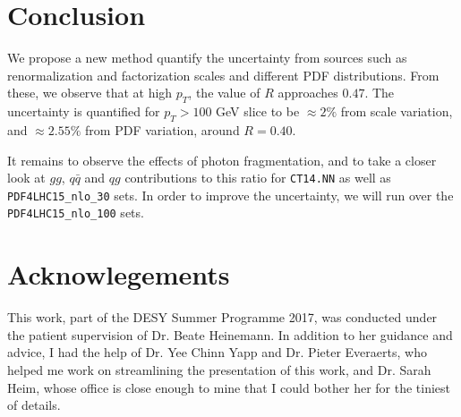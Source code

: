 \documentclass[11pt,a4paper,final]{report}
\begin{document}
\section{Conclusion}
We propose a new method quantify the uncertainty from sources such as renormalization and factorization scales and different PDF distributions. From these, we observe that at high $p_T$, the value of $R$ approaches $0.47$. The uncertainty is quantified for $p_T > 100$ GeV slice to be $\approx 2\%$ from scale variation, and $\approx 2.55\%$ from PDF variation, around $R = 0.40$.

It remains to observe the effects of photon fragmentation, and to take a closer look at $gg$, $q\bar{q}$ and $qg$ contributions to this ratio for \texttt{CT14.NN} as well as \texttt{PDF4LHC15\_nlo\_30} sets. In order to improve the uncertainty, we will run over the \texttt{PDF4LHC15\_nlo\_100} sets.

\section*{Acknowlegements}
This work, part of the DESY Summer Programme 2017, was conducted under the patient supervision of Dr. Beate Heinemann. In addition to her guidance and advice, I had the help of Dr. Yee Chinn Yapp and Dr. Pieter Everaerts, who helped me work on streamlining the presentation of this work, and Dr. Sarah Heim, whose office is close enough to mine that I could bother her for the tiniest of details.
\end{document}
